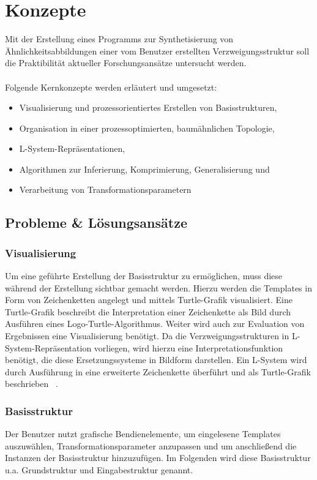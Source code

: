 
\chapter{Konzepte}
Mit der Erstellung eines Programms zur Synthetisierung von Ähnlichkeitsabbildungen einer vom Benutzer
erstellten Verzweigungsstruktur soll die Praktibilität aktueller Forschungsansätze untersucht werden.
\\~\\
Folgende Kernkonzepte werden erläutert und umgesetzt:
\begin{itemize}
    \item Visualisierung und prozessorientiertes Erstellen von Basisstrukturen,
    \item Organisation in einer prozessoptimierten, baumähnlichen Topologie,
    \item L-System-Repräsentationen,
    \item Algorithmen zur Inferierung, Komprimierung, Generalisierung und
    \item Verarbeitung von Transformationsparametern
\end{itemize}

\section{Probleme \& Lösungsansätze}

\subsection*{Visualisierung}
Um eine geführte Erstellung der Basisstruktur zu ermöglichen, muss diese während der Erstellung sichtbar gemacht werden.
Hierzu werden die Templates in Form von Zeichenketten angelegt und mittels Turtle-Grafik visualisiert.
Eine Turtle-Grafik beschreibt die Interpretation einer Zeichenkette als Bild durch Ausführen eines Logo-Turtle-Algorithmus.
Weiter wird auch zur Evaluation von Ergebnissen eine Visualisierung benötigt.
Da die Verzweigungsstrukturen in L-System-Repräsentation vorliegen, wird hierzu eine Interpretationsfunktion benötigt,
die diese Ersetzungssysteme in Bildform darstellen.
Ein L-System wird durch Ausführung in eine erweiterte Zeichenkette überführt und als Turtle-Grafik beschrieben
~\cite{prusinkiewicz_1986}.

\subsection*{Basisstruktur}
Der Benutzer nutzt grafische Bendienelemente, um eingelesene Templates auszuwählen, Transformationsparameter anzupassen
und um anschließend die Instanzen der Basisstruktur hinzuzufügen.
Im Folgenden wird diese Basisstruktur u.a. Grundstruktur und Eingabestruktur genannt.

